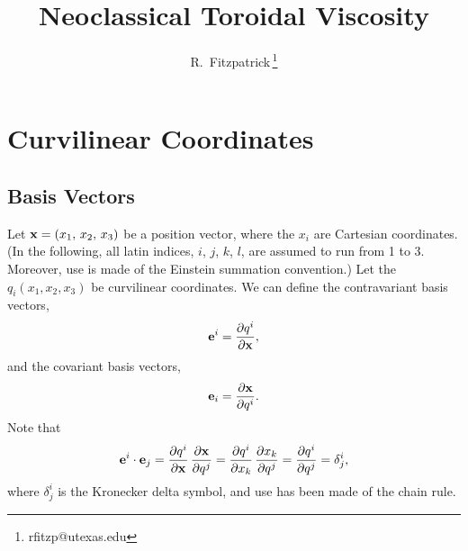 \documentclass[12pt,prb,aps,notitlepage]{revtex4-1}
\begin{document}
\title{Neoclassical Toroidal Viscosity}
\author{R.~Fitzpatrick\,\footnote{rfitzp@utexas.edu}}
\begin{abstract}
\end{abstract}
\maketitle

\section{Curvilinear Coordinates}
\subsection{Basis Vectors} 
Let ${\bf x}=(x_1,\,x_2,\,x_3)$ be a position vector, where the $x_i$ are Cartesian coordinates.  (In the following, all latin indices, $i$, $j$, $k$, $l$, are assumed to run from 1 to 3. Moreover,
use is made of the Einstein summation convention.)
Let the $q_i(x_1,x_2,x_3)$ be curvilinear coordinates. We can define the contravariant basis vectors,
\begin{equation}\label{e1}
{\bf e}^i = \frac{\partial q^i}{\partial {\bf x}},
\end{equation}
and the covariant basis vectors, 
\begin{equation}\label{e2}
{\bf e}_i = \frac{\partial {\bf x}}{\partial q^i}.
\end{equation}
Note that
\begin{equation}\label{e3}
{\bf e}^i\cdot{\bf e}_j = \frac{\partial q^i}{\partial {\bf x}}\,\frac{\partial {\bf x}}{\partial q^j}= \frac{\partial q^i}{\partial x_k}\,\frac{\partial x_k}{\partial q^j}=
\frac{\partial q^i}{\partial q^j} = \delta^i_j,
\end{equation}
where  $\delta^i_j$ is the Kronecker delta symbol, and use has been made of the chain rule. 
\end{document}
